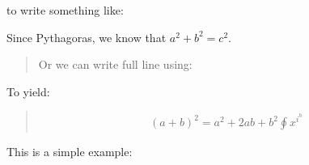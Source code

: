 \documentclass[letterpaper,10pt,english]{sphinxmanual}
\begin{document}
to write something like:

Since Pythagoras, we know that \(a^2 + b^2 = c^2\).
\begin{quote}

Or we can write full line using:

\begin{sphinxVerbatim}[commandchars=\\\{\}]
           \PYGZbs{} 
\end{sphinxVerbatim}
\end{quote}

To yield:
\begin{quote}
\begin{equation*}
\begin{split}(a + b)^2 = a^2 + 2ab + b^2 \oint x^{i^h}\end{split}
\end{equation*}\end{quote}

This is a simple example:

\begin{sphinxVerbatim}[commandchars=\\\{\}]
 
 
\end{sphinxVerbatim}



\renewcommand{\indexname}{Index}
\printindex
\end{document}
